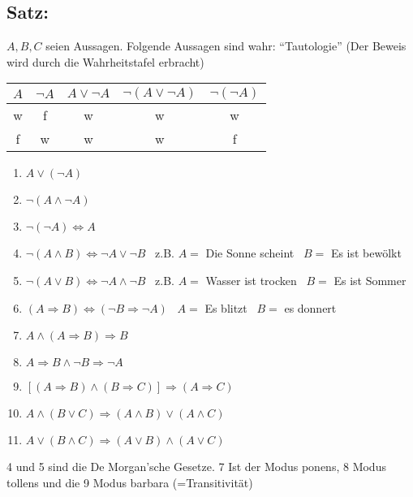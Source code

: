 \subsection{Satz:}
$A,B,C$ seien Aussagen. Folgende Aussagen sind wahr: "`Tautologie"' (Der Beweis wird durch die Wahrheitstafel erbracht)
\begin{center}
\begin{tabular}{cc||ccc}
$A$ & $\neg A$ & $A \vee \neg A$ & $\neg(A\vee \neg A)$ & $\neg(\neg A)$\\ \hline
w & f & w & w & w\\
f & w & w & w & f\\
\end{tabular}
\end{center}
\begin{multicols}{2} 
\begin{enumerate}
\item $A\vee(\neg A)$
\item $\neg (A \wedge \neg A)$
\item $\neg (\neg A) \Leftrightarrow A$
\item $\neg (A \wedge B) \Leftrightarrow \neg A \vee \neg B$ \ z.B. $A=$ Die Sonne scheint \ $B=$ Es ist bewölkt
\item $\neg (A \vee B) \Leftrightarrow \neg A \wedge \neg B$ \ z.B. $A=$ Wasser ist trocken \ $B=$ Es ist Sommer
\item $(A\Rightarrow B) \Leftrightarrow (\neg B \Rightarrow \neg A)$ \ $A=$ Es blitzt \ $B=$ es donnert
\item $A \wedge (A \Rightarrow B) \Rightarrow B$
\item $A \Rightarrow B \wedge \neg B \Rightarrow \neg A$
\item $[(A\Rightarrow B) \wedge(B\Rightarrow C)]\Rightarrow(A\Rightarrow C)$
\item $A\wedge (B\vee C)\Rightarrow (A\wedge B)\vee(A\wedge C)$
\item $A \vee(B\wedge C) \Rightarrow (A\vee B) \wedge (A \vee C)$
\end{enumerate}
\end{multicols}
4 und 5 sind die De Morgan'sche Gesetze. 7 Ist der Modus ponens, 8 Modus tollens und die 9 Modus barbara (=Transitivität)\\
%
%
%
